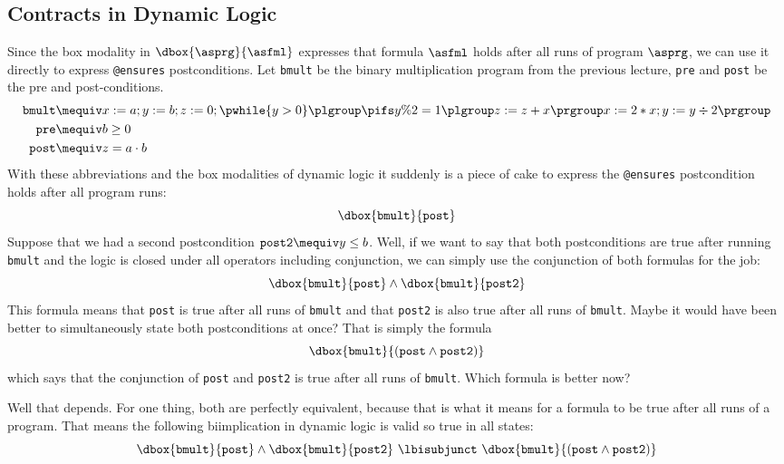 \documentclass[11pt,twoside]{scrartcl}
\begin{document}
\subsection{Contracts in Dynamic Logic}

Since the box modality in \(\dbox{\asprg}{\asfml}\) expresses that formula $\asfml$ holds after all runs of program $\asprg$, we can use it directly to express \verb'@ensures' postconditions.
Let \texttt{bmult} be the binary multiplication program from the previous lecture, \texttt{pre} and \texttt{post} be the pre and post-conditions.
\begin{align*}
  \texttt{bmult} &\mequiv x:=a; y:=b; z:=0; \pwhile{y>0}{\plgroup \pifs{y\%2=1}{\plgroup z:=z+x \prgroup} x:=2*x; y:=y \div 2\prgroup}\\
  \texttt{pre} &\mequiv b \ge 0\\
  \texttt{post} &\mequiv z = a \cdot b
\end{align*}
With these abbreviations and the box modalities of dynamic logic it suddenly is a piece of cake to express the \verb'@ensures' postcondition holds after all program runs:
\[
\dbox{\texttt{bmult}}{\texttt{post}}
\]
Suppose that we had a second postcondition $\texttt{post2} \mequiv y \le b$.
Well, if we want to say that both postconditions are true after running \texttt{bmult} and the logic is closed under all operators including conjunction, we can simply use the conjunction of both formulas for the job:
\[
\dbox{\texttt{bmult}}{\texttt{post}} \land \dbox{\texttt{bmult}}{\texttt{post2}}
\]
This formula means that \texttt{post} is true after all runs of \texttt{bmult} and that \texttt{post2} is also true after all runs of \texttt{bmult}.
Maybe it would have been better to simultaneously state both postconditions at once?
That is simply the formula
\[
\dbox{\texttt{bmult}}{(\texttt{post} \land \texttt{post2})}
\]
which says that the conjunction of \texttt{post} and \texttt{post2} is true after all runs of \texttt{bmult}.
Which formula is better now?

Well that depends. For one thing, both are perfectly equivalent, because that is what it means for a formula to be true after all runs of a program.
That means the following biimplication in dynamic logic is valid so true in all states:
\[
\dbox{\texttt{bmult}}{\texttt{post}} \land \dbox{\texttt{bmult}}{\texttt{post2}}
~\lbisubjunct~
\dbox{\texttt{bmult}}{(\texttt{post} \land \texttt{post2})}
\]
\end{document}
